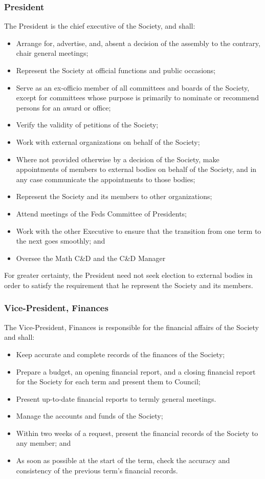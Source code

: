 \subsubsection{President}
The President is the chief executive of the Society, and shall:
\begin{itemize}
  \item Arrange for, advertise, and, absent a decision of the assembly to the
    contrary, chair general meetings;
  \item Represent the Society at official functions and public occasions;
  \item Serve as an ex-officio member of all committees and boards of the
    Society, except for committees whose purpose is primarily to nominate or
    recommend persons for an award or office;
  \item Verify the validity of petitions of the Society;
  \item Work with external organizations on behalf of the Society;
  \item Where not provided otherwise by a decision of the Society, make
    appointments of members to external bodies on behalf of the Society, and in
    any case communicate the appointments to those bodies;
  \item Represent the Society and its members to other organizations;
  \item Attend meetings of the Feds Committee of Presidents;
  \item Work with the other Executive to ensure that the transition from one
    term to the next goes smoothly; and
  \item Oversee the Math C\&D and the C\&D Manager
\end{itemize}

For greater certainty, the President need not seek election to external bodies
in order to satisfy the requirement that he represent the Society and its
members.

\subsubsection{Vice-President, Finances}
The Vice-President, Finances is responsible for the financial affairs of the
Society and shall:
\begin{itemize}
  \item Keep accurate and complete records of the finances of the Society;
  \item Prepare a budget, an opening financial report, and a closing financial
    report for the Society for each term and present them to Council;
  \item Present up-to-date financial reports to termly general meetings.
  \item Manage the accounts and funds of the Society;
  \item Within two weeks of a request, present the financial records of the
    Society to any member; and
  \item As soon as possible at the start of the term, check the accuracy and
    consistency of the previous term's financial records.
\end{itemize}

